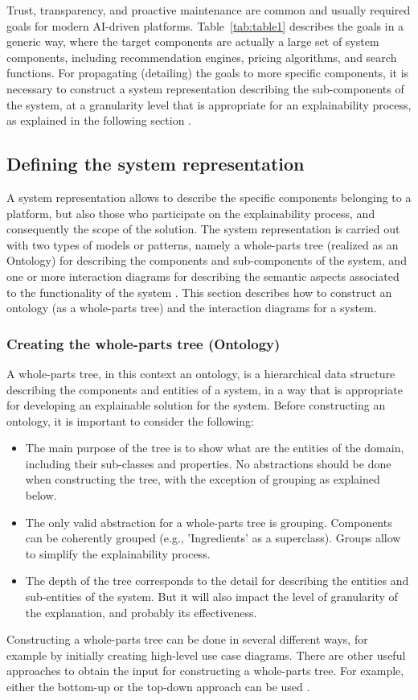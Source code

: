 \documentclass[conference]{IEEEtran}
\begin{document}
Trust, transparency, and proactive maintenance are common and usually required goals for modern AI-driven platforms. Table~\ref{tab:table1} describes the goals in a generic way, where the target components are actually a large set of system components, including recommendation engines, pricing algorithms, and search functions. For propagating (detailing) the goals to more specific components, it is necessary to construct a system representation describing the sub-components of the system, at a granularity level that is appropriate for an explainability process, as explained in the following section \cite{ref8}.

\subsection{Defining the system representation}
A system representation allows to describe the specific components belonging to a platform, but also those who participate on the explainability process, and consequently the scope of the solution. The system representation is carried out with two types of models or patterns, namely a whole-parts tree (realized as an Ontology) for describing the components and sub-components of the system, and one or more interaction diagrams for describing the semantic aspects associated to the functionality of the system \cite{ref9}. This section describes how to construct an ontology (as a whole-parts tree) and the interaction diagrams for a system.

\subsubsection{Creating the whole-parts tree (Ontology)}
A whole-parts tree, in this context an ontology, is a hierarchical data structure describing the components and entities of a system, in a way that is appropriate for developing an explainable solution for the system. Before constructing an ontology, it is important to consider the following:
\begin{itemize}
  \item The main purpose of the tree is to show what are the entities of the domain, including their sub-classes and properties. No abstractions should be done when constructing the tree, with the exception of grouping as explained below.
  \item The only valid abstraction for a whole-parts tree is grouping. Components can be coherently grouped (e.g., 'Ingredients' as a superclass). Groups allow to simplify the explainability process.
  \item The depth of the tree corresponds to the detail for describing the entities and sub-entities of the system. But it will also impact the level of granularity of the explanation, and probably its effectiveness.
\end{itemize}
Constructing a whole-parts tree can be done in several different ways, for example by initially creating high-level use case diagrams. There are other useful approaches to obtain the input for constructing a whole-parts tree. For example, either the bottom-up or the top-down approach can be used \cite{ref10}.
\end{document}
